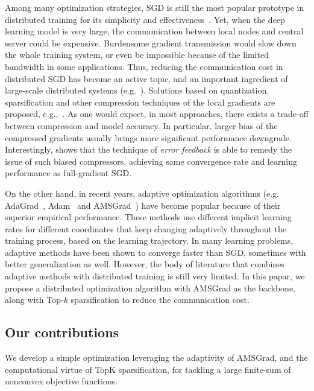 \documentclass[11pt]{article}
\begin{document}
Among many optimization strategies, SGD is still the most popular prototype in distributed training for its simplicity and effectiveness~\cite{chilimbi2014project,Proc:Agrawal_NIPS19,mikami2018massively}. Yet, when the deep learning model is very large, the communication between local nodes and central server could be expensive. Burdensome gradient transmission would slow down the whole training system, or even be impossible because of the limited bandwidth in some applications. Thus, reducing the communication cost in distributed SGD has become an active topic, and an important ingredient of large-scale distributed systems (e.g.~\cite{Proc:Seide14}). Solutions based on quantization, sparsification and other compression techniques of the local gradients are proposed, e.g.,~\cite{alistarh2017qsgd,wen2017terngrad,wangni2018gradient,stich2018sparsified,aji2017sparse,bernstein2018signsgd,de2017understanding,yang2019swalp,Proc:Ivkin_NIPS19}. As one would expect, in most approaches, there exists a trade-off between compression and model accuracy. In particular, larger bias of the compressed gradients usually brings more significant performance downgrade. Interestingly, \cite{karimireddy2019error} shows that the technique of \textit{error feedback} is able to remedy the issue of such biased compressors, achieving same convergence rate and learning performance as full-gradient SGD.


On the other hand, in recent years, adaptive optimization algorithms (e.g. AdaGrad~\cite{Duchi10-adagrad}, Adam~\cite{kingma2014adam} and AMSGrad~\cite{reddi2019convergence}) have become popular because of their superior empirical performance. These methods use different implicit learning rates for different coordinates that keep changing adaptively throughout the training process, based on the learning trajectory. In many learning problems, adaptive methods have been shown to converge faster than SGD, sometimes with better generalization as well. However, the body of literature that combines adaptive methods with distributed training is still very limited. In this papar, we propose a distributed optimization algorithm with AMSGrad as the backbone, along with Top-$k$ sparsification to reduce the communication cost.

\subsection{Our contributions}

We develop a simple optimization leveraging the adaptivity of AMSGrad, and the computational virtue of TopK sparsification, for tackling a large finite-sum of nonconvex objective functions.
\end{document}
